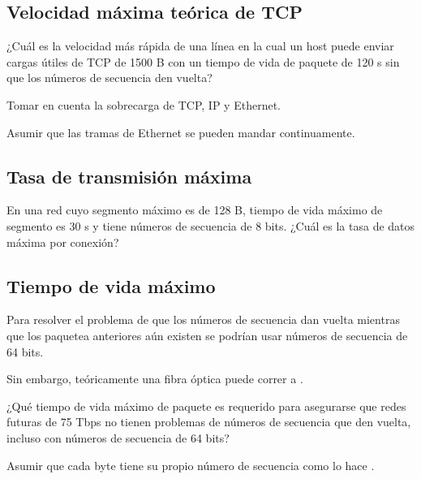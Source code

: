 \documentclass[12pt]{report}
\begin{document}
\begin{exer}
	\subsection{Velocidad máxima teórica de TCP \sfour \shard}
	¿Cuál es la velocidad más rápida de una línea en la cual un host puede enviar
	cargas útiles de TCP de 1500 B con un tiempo de vida de paquete de 120 s sin que los
	números de secuencia den vuelta?

	Tomar en cuenta la sobrecarga de TCP, IP y Ethernet.

	Asumir que las tramas de Ethernet se pueden mandar continuamente.
\end{exer}

\begin{exer}
	\subsection{Tasa de transmisión máxima \sthree}
	En una red cuyo segmento máximo es de 128 B, tiempo de vida máximo de
	segmento es 30 s y tiene números de secuencia de 8 bits. ¿Cuál es la tasa de datos máxima
	por conexión?
\end{exer}

\begin{exer}
	\subsection{Tiempo de vida máximo \sthree}
	Para resolver el problema de que los números de secuencia dan vuelta mientras
	que los paquetea anteriores aún existen se podrían usar números de secuencia de 64 bits.

	Sin embargo, teóricamente una fibra óptica puede correr a .

	¿Qué tiempo de vida máximo de paquete es requerido para asegurarse que redes futuras de 75 Tbps no tienen problemas de números de secuencia que den vuelta, incluso con números de secuencia de 64 bits?

	Asumir que cada byte tiene su propio número de secuencia como lo hace .
\end{exer}
\end{document}

